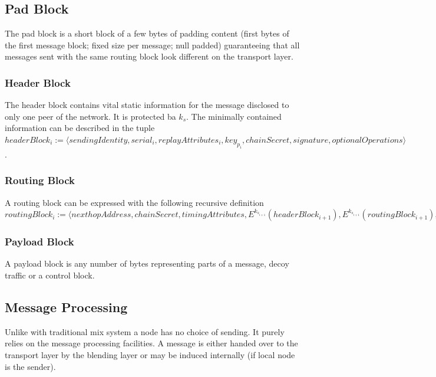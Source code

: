 \documentclass[9pt,journal,compsoc]{IEEEtran}
\begin{document}
\subsection{Pad Block}
The pad block is a short block of a few bytes of padding content (first bytes of the first message block; fixed size per message; null padded) guaranteeing that all messages sent with the same routing block look different on the transport layer.

\subsubsection{Header Block}
The header block contains vital static information for the message disclosed to only one peer of the network. It is protected ba $k_s$. The minimally contained information can be described in the tuple $headerBlock_i:=\langle sendingIdentity,\allowbreak{} serial_i,\allowbreak{} replayAttributes_i,\allowbreak{} key_{p_i},\allowbreak{} chainSecret,\allowbreak{} signature,\allowbreak{} optionalOperations \rangle$.

\subsubsection{Routing Block}
A routing block can be expressed with the following recursive definition $routingBlock_i:=\langle\allowbreak{} nexthopAddress,\allowbreak{} chainSecret,\allowbreak{} timingAttributes,\allowbreak{} E^{k_{s_{i+1}}}\left(headerBlock_{i+1}\right),\allowbreak{} E^{k_{s_{i+1}}}\left(routingBlock_{i+1}\right),\allowbreak{} payloadBuildInstructions_i,\allowbreak{} payloadId,\allowbreak{} optionalReplyBlocks \rangle$

\subsubsection{Payload Block}
A payload block is any number of bytes representing parts of a message, decoy traffic or a control block.

\subsection{Message Processing\label{sec:processing}}
Unlike with traditional mix system a node has no choice of sending. It purely relies on the message processing facilities. A message is either handed over to the transport layer by the blending layer or may be induced internally (if local node is the sender). 
\end{document}
